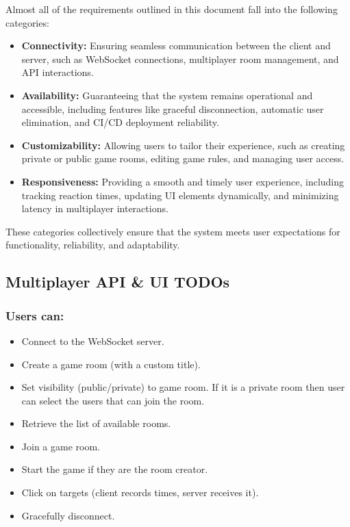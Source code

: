 \documentclass[]{VUMIFTemplateClass}
\begin{document}
Almost all of the requirements outlined in this document fall into the following categories:

\begin{itemize}
    \item \textbf{Connectivity:} Ensuring seamless communication between the client and server, such as WebSocket connections, multiplayer room management, and API interactions.
    \item \textbf{Availability:} Guaranteeing that the system remains operational and accessible, including features like graceful disconnection, automatic user elimination, and CI/CD deployment reliability.
    \item \textbf{Customizability:} Allowing users to tailor their experience, such as creating private or public game rooms, editing game rules, and managing user access.
    \item \textbf{Responsiveness:} Providing a smooth and timely user experience, including tracking reaction times, updating UI elements dynamically, and minimizing latency in multiplayer interactions.
\end{itemize}

These categories collectively ensure that the system meets user expectations for functionality, reliability, and adaptability.

\subsection{Multiplayer API \& UI TODOs}

\subsubsection{Users can:}
\begin{itemize}
    \item Connect to the WebSocket server.
    \item Create a game room (with a custom title).
    \item Set visibility (public/private) to game room. If it is a private room then user can select the users that can join the room.
    \item Retrieve the list of available rooms.
    \item Join a game room.
    \item Start the game if they are the room creator.
    \item Click on targets (client records times, server receives it).
    \item Gracefully disconnect.
\end{itemize}
\end{document}
